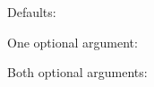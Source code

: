 \documentclass{article}
\begin{document}
Defaults: 

One optional argument: 

Both optional arguments: 
\end{document}
